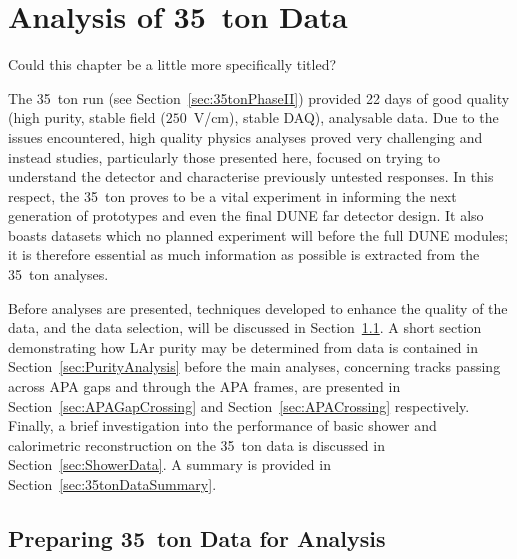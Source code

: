 
\graphicspath{{35tonAnalysis/Figs/}}

\chapter{Analysis of 35~ton Data}\label{chap:35tonAnalysis}

{\color{red} Could this chapter be a little more specifically titled?}

The 35~ton run (see Section~\ref{sec:35tonPhaseII}) provided 22 days of good quality (high purity, stable field ($250$~V/cm), stable DAQ), analysable data.  Due to the issues encountered, high quality physics analyses proved very challenging and instead studies, particularly those presented here, focused on trying to understand the detector and characterise previously untested responses.  In this respect, the 35~ton proves to be a vital experiment in informing the next generation of prototypes and even the final DUNE far detector design.  It also boasts datasets which no planned experiment will before the full DUNE modules; it is therefore essential as much information as possible is extracted from the 35~ton analyses.

Before analyses are presented, techniques developed to enhance the quality of the data, and the data selection, will be discussed in Section~\ref{sec:Preparing35tonData}.  A short section demonstrating how LAr purity may be determined from data is contained in Section~\ref{sec:PurityAnalysis} before the main analyses, concerning tracks passing across APA gaps and through the APA frames, are presented in Section~\ref{sec:APAGapCrossing} and Section~\ref{sec:APACrossing} respectively.  Finally, a brief investigation into the performance of basic shower and calorimetric reconstruction on the 35~ton data is discussed in Section~\ref{sec:ShowerData}.  A summary is provided in Section~\ref{sec:35tonDataSummary}.

\section{Preparing 35~ton Data for Analysis}\label{sec:Preparing35tonData}

